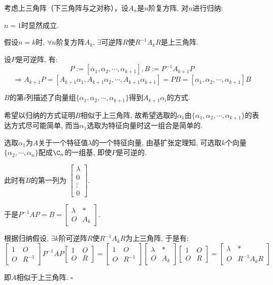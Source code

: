 \documentclass[UTF8]{ctexart}
\begin{document}
		\begin{prf} 
		
			考虑上三角阵（下三角阵与之对称），设$A_n$是$n$阶复方阵, 对$n$进行归纳: 

			$n=1$时显然成立. 

			假设$n=k$时, $\forall n$阶复方阵$A_k$, $\exists$可逆阵$R$使$R^{-1}A_k R$是上三角阵. 
			
			设$P$是可逆阵, 有: 
			\[P:=[\alpha_1,\alpha_2,\cdots,\alpha_{k+1}], B:=P^{-1}A_{k+1}P\]
			\[\Longrightarrow A_{k+1}P=[A_{k+1}\alpha_1,A_{k+1}\alpha_2,\cdots,A_{k+1}\alpha_{k+1}]=PB=[\alpha_1,\alpha_2,\cdots,\alpha_{k+1}]B\]
			
			$B$的第$i$列描述了向量组$\{\alpha_1,\alpha_2,\cdots,\alpha_{k+1}\}$ 得到$A_{k+1}\alpha_i$的方式. 

			希望以归纳的方式证明$B$相似于上三角阵, 故希望选取的$\alpha_1$由$\{\alpha_1,\alpha_2,\cdots,\alpha_{k+1}\}$ 的表达方式尽可能简单, 而当$\alpha_1$选取为特征向量时这一组合是简单的. 

			选取$\alpha_1$为$A$关于一个特征值$\lambda$的一个特征向量, 由基扩张定理知, 可选取$k$个向量$\{\alpha_2,\cdots,\alpha_n\}$配成$\C_n$的一组基, 即使$P$是可逆的. 
			
			此时有$B$的第一列为
			$\begin{bmatrix}
				\lambda\\
				0\\
				\vdots\\
				0
			\end{bmatrix}$. 
			
			于是$P^{-1}AP=B=
			\begin{bmatrix}
				\lambda & *\\
				O & A_{k}
			\end{bmatrix}$. 

			根据归纳假设, $\exists k$阶可逆阵$R$使$R^{-1}A_{k}R$为上三角阵, 于是有: 
			\[\begin{bmatrix}
				1 & O\\
				O & R^{-1}
			\end{bmatrix}
			P^{-1}AP
			\begin{bmatrix}
				1 & O\\
				O & R
			\end{bmatrix}=
			\begin{bmatrix}
				1 & O\\
				O & R^{-1}
			\end{bmatrix}
			\begin{bmatrix}
				\lambda & *\\
				O & A_{k}
			\end{bmatrix}
			\begin{bmatrix}
				1 & O\\
				O & R
			\end{bmatrix}=
			\begin{bmatrix}
				\lambda & *\\
				O & R^{-1}A_k R
			\end{bmatrix}\]

			即$A$相似于上三角阵. $\square$
		\end{prf}
	
\end{document}

